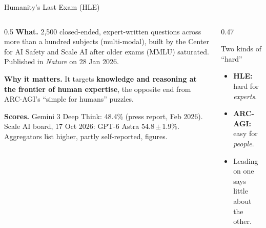 \begin{frame}{Humanity's Last Exam (HLE)}
\begin{columns}[T]
\begin{column}{0.5\textwidth}
\small
\textbf{What.} 2,500 closed-ended, expert-written questions across more than a hundred subjects (multi-modal), built by the Center for AI Safety and Scale AI after older exams (MMLU) saturated. Published in \emph{Nature} on 28 Jan 2026.

\textbf{Why it matters.} It targets \textbf{knowledge and reasoning at the frontier of human expertise}, the opposite end from ARC-AGI's ``simple for humans'' puzzles.

\textbf{Scores.} Gemini 3 Deep Think: 48.4\% (press report, Feb 2026). Scale AI board, 17 Oct 2026: GPT-6 Astra 54.8\,$\pm$\,1.9\%. Aggregators list higher, partly self-reported, figures.
\end{column}
\begin{column}{0.47\textwidth}
\begin{sfig}[0.26]\end{sfig}
\begin{block}{Two kinds of ``hard''}
{\small
\begin{itemize}\setlength\itemsep{3pt}
\item \textbf{HLE:} hard for \emph{experts}.
\item \textbf{ARC-AGI:} easy for \emph{people}.
\item Leading on one says little about the other.
\end{itemize}}
\end{block}
\end{column}
\end{columns}
\end{frame}

